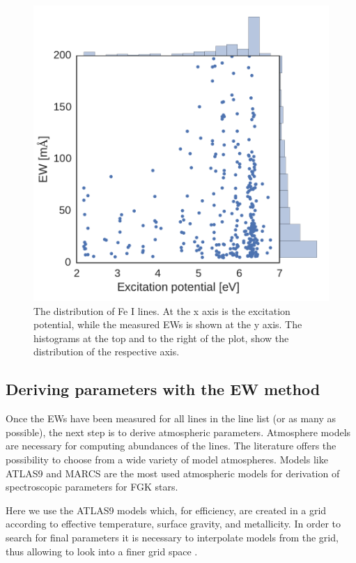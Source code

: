 \documentclass{aa}
\begin{document}
\begin{figure}[tpb]
    \centering
    \includegraphics[width=0.9\linewidth]{figures/EWvsEP_cut.pdf}
    \caption{The distribution of Fe I lines. At the x axis is the
    excitation potential, while the measured EWs is shown at the y axis.
    The histograms at the top and to the right of the plot, show the
    distribution of the respective axis.}
    \label{fig:Fe1_after_recal}
\end{figure}



\subsection{Deriving parameters with the EW method}
\label{sec:deriving_parameters_with_the_ew_method}

Once the EWs have been measured for all lines in the line list (or as
many as possible), the next step is to derive atmospheric parameters.
Atmosphere models are necessary for computing abundances of the lines.
The literature offers the possibility to choose from a wide variety
of model atmospheres. Models like ATLAS9 \citep{Kurucz1993} and
MARCS \citep{Gustafson2008} are the most used atmospheric models for
derivation of spectroscopic parameters for FGK stars.

Here we use the ATLAS9 models which, for efficiency, are created
in a grid according to effective temperature, surface gravity, and
metallicity. In order to search for final parameters it is necessary to
interpolate models from the grid, thus allowing to look into a finer
grid space \citep[see e.g.][]{Sousa2014}.
\end{document}
